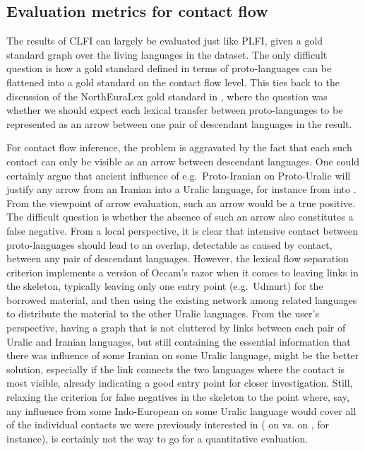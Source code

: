 \subsection{Evaluation metrics for contact flow}
The results of CLFI can largely be evaluated just like PLFI, given a gold standard graph over the living languages in the dataset. The only difficult question is how a gold standard defined in terms of proto-languages can be flattened into a gold standard on the contact flow level. This ties back to the discussion of the NorthEuraLex gold standard in , where the question was whether we should expect each lexical transfer between proto-languages to be represented as an arrow between one pair of descendant languages in the result.

For contact flow inference, the problem is aggravated by the fact that each such contact can only be visible as an arrow between descendant languages. One could certainly argue that ancient influence of e.g.\ Proto-Iranian on Proto-Uralic will justify any arrow from an Iranian into a Uralic language, for instance from  into . From the viewpoint of arrow evaluation, such an arrow would be a true positive. The difficult question is whether the absence of such an arrow also constitutes a false negative. From a local perspective, it is clear that intensive contact between proto-languages should lead to an overlap, detectable as caused by contact, between any pair of descendant languages. However, the lexical flow separation criterion implements a version of Occam's razor when it comes to leaving links in the skeleton, typically leaving only one entry point (e.g.\ Udmurt) for the borrowed material, and then using the existing network among 
related languages to distribute the material to the other Uralic languages. From the user's perspective, having a graph that is not cluttered by links between each pair of Uralic and Iranian languages, but still containing the essential information that there was influence of some Iranian on some Uralic language, might be the better solution, especially if the link connects the two languages where the contact is most visible, already indicating a good entry point for closer investigation. Still, relaxing the criterion for false negatives in the skeleton to the point where, say, any influence from some Indo-European on some Uralic language would cover all of the individual contacts we were previously interested in ( on  vs.  on , for instance), is certainly not the way to go for a quantitative evaluation.


